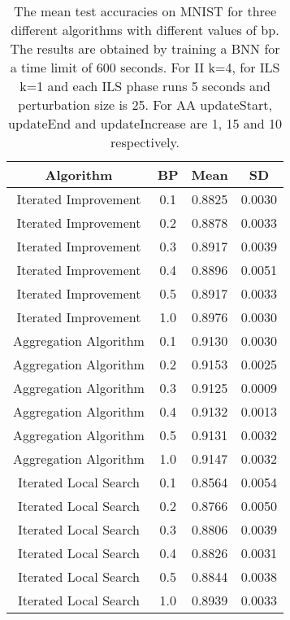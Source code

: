 \begin{center}
\begin{table}[H]
\centering
\begin{tabular}{|c|c|c|c|}
  \hline
Algorithm & BP & Mean & SD \\ 
  \hline
Iterated Improvement & 0.1 & 0.8825 & 0.0030 \\ 
   \hline
Iterated Improvement & 0.2 & 0.8878 & 0.0033 \\ 
   \hline
Iterated Improvement & 0.3 & 0.8917 & 0.0039 \\ 
   \hline
Iterated Improvement & 0.4 & 0.8896 & 0.0051 \\ 
   \hline
Iterated Improvement & 0.5 & 0.8917 & 0.0033 \\ 
   \hline
Iterated Improvement & 1.0 & 0.8976 & 0.0030 \\ 
   \hline
Aggregation Algorithm & 0.1 & 0.9130 & 0.0030 \\ 
   \hline
Aggregation Algorithm & 0.2 & 0.9153 & 0.0025 \\ 
   \hline
Aggregation Algorithm & 0.3 & 0.9125 & 0.0009 \\ 
   \hline
Aggregation Algorithm & 0.4 & 0.9132 & 0.0013 \\ 
   \hline
Aggregation Algorithm & 0.5 & 0.9131 & 0.0032 \\ 
   \hline
Aggregation Algorithm & 1.0 & 0.9147 & 0.0032 \\ 
   \hline
Iterated Local Search & 0.1 & 0.8564 & 0.0054 \\ 
   \hline
Iterated Local Search & 0.2 & 0.8766 & 0.0050 \\ 
   \hline
Iterated Local Search & 0.3 & 0.8806 & 0.0039 \\ 
   \hline
Iterated Local Search & 0.4 & 0.8826 & 0.0031 \\ 
   \hline
Iterated Local Search & 0.5 & 0.8844 & 0.0038 \\ 
   \hline
Iterated Local Search & 1.0 & 0.8939 & 0.0033 \\ 
   \hline
\end{tabular}
\caption{The mean test accuracies on MNIST for three different algorithms with different values of bp.
            The results are obtained by training a BNN for a time limit of 600 seconds. For II k=4, for
            ILS k=1 and each ILS phase runs 5 seconds and perturbation size is 25. For AA updateStart, updateEnd
            and updateIncrease are 1, 15 and 10 respectively. } 
\label{MBT_FTBP}
\end{table}

\end{center}
